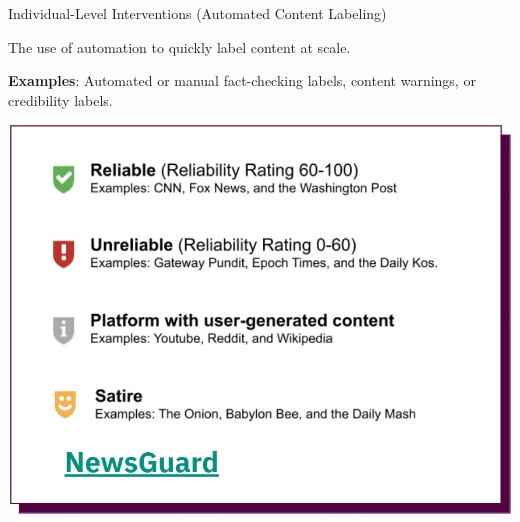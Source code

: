 \documentclass[nobackground,dvipsnames,table]{beamer}
\begin{document}
\begin{frame}{Individual-Level Interventions
(Automated Content Labeling)}
\begin{minipage}{0.37\textwidth}
    \raggedright{
    \footnotesize{
        The use of automation to quickly label content at scale. \newline 

        \textbf{Examples}: Automated or manual fact-checking labels, content warnings, or credibility labels.
    }}
\end{minipage}
\hspace{0.02\textwidth}
\begin{minipage}{0.58\textwidth}
    \includegraphics[width=\textwidth]{img/fig9.jpg}
\end{minipage}


    
\end{frame}
\end{document}
